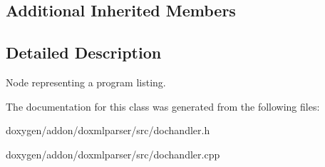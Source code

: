 \subsection*{Additional Inherited Members}


\subsection{Detailed Description}
Node representing a program listing. 



The documentation for this class was generated from the following files\+:\begin{DoxyCompactItemize}
\item 
doxygen/addon/doxmlparser/src/dochandler.\+h\item 
doxygen/addon/doxmlparser/src/dochandler.\+cpp\end{DoxyCompactItemize}
